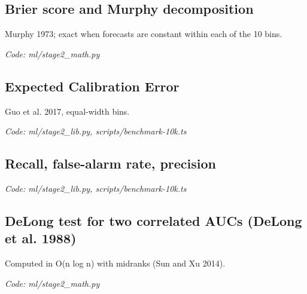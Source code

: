 \documentclass[11pt,a4paper]{article}
\newcommand{\where}[1]{\par{\small\itshape\color{mute}Code: #1}\par}
\begin{document}
\subsection*{Brier score and Murphy decomposition}
\par\smallskip\noindent{}\par\smallskip
\par\smallskip\noindent{}\par\smallskip
\par\smallskip\noindent{}\par\smallskip
Murphy 1973; exact when forecasts are constant within each of the 10 bins.
\where{ml/stage2\_math.py}

\subsection*{Expected Calibration Error}
\par\smallskip\noindent{}\par\smallskip
Guo et al. 2017, equal-width bins.
\where{ml/stage2\_lib.py, scripts/benchmark-10k.ts}

\subsection*{Recall, false-alarm rate, precision}
\par\smallskip\noindent{}\par\smallskip
\where{ml/stage2\_lib.py, scripts/benchmark-10k.ts}

\subsection*{DeLong test for two correlated AUCs (DeLong et al. 1988)}
\par\smallskip\noindent{}\par\smallskip
\par\smallskip\noindent{}\par\smallskip
Computed in O(n log n) with midranks (Sun and Xu 2014).
\where{ml/stage2\_math.py}
\end{document}
